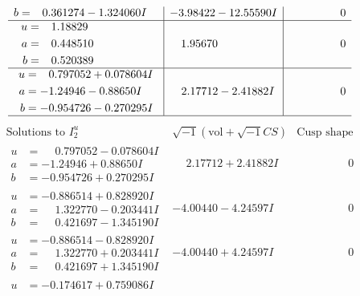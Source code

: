 \documentclass[1p]{elsarticle_modified}
\theoremstyle{definition}
\newcommand{\I}{\sqrt{-1}}
\begin{document}
$$\begin{array}{c|c|c}
\begin{aligned}
b &= \phantom{-}0.361274 - 1.324060 I\end{aligned}
 & -3.98422 - 12.55590 I & \phantom{-0.000000 } 0 \\ \hline\begin{aligned}
u &= \phantom{-}1.18829\phantom{ +0.000000I} \\
a &= \phantom{-}0.448510\phantom{ +0.000000I} \\
b &= \phantom{-}0.520389\phantom{ +0.000000I}\end{aligned}
 & \phantom{-}1.95670\phantom{ +0.000000I} & \phantom{-0.000000 } 0 \\ \hline\begin{aligned}
u &= \phantom{-}0.797052 + 0.078604 I \\
a &= -1.24946 - 0.88650 I \\
b &= -0.954726 - 0.270295 I\end{aligned}
 & \phantom{-}2.17712 - 2.41882 I & \phantom{-0.000000 } 0\\
 \hline 
 \end{array}$$\newpage$$\begin{array}{c|c|c}  
\text{Solutions to }I^u_{2}& \I (\text{vol} + \sqrt{-1}CS) & \text{Cusp shape}\\
 \hline 
\begin{aligned}
u &= \phantom{-}0.797052 - 0.078604 I \\
a &= -1.24946 + 0.88650 I \\
b &= -0.954726 + 0.270295 I\end{aligned}
 & \phantom{-}2.17712 + 2.41882 I & \phantom{-0.000000 } 0 \\ \hline\begin{aligned}
u &= -0.886514 + 0.828920 I \\
a &= \phantom{-}1.322770 - 0.203441 I \\
b &= \phantom{-}0.421697 - 1.345190 I\end{aligned}
 & -4.00440 - 4.24597 I & \phantom{-0.000000 } 0 \\ \hline\begin{aligned}
u &= -0.886514 - 0.828920 I \\
a &= \phantom{-}1.322770 + 0.203441 I \\
b &= \phantom{-}0.421697 + 1.345190 I\end{aligned}
 & -4.00440 + 4.24597 I & \phantom{-0.000000 } 0 \\ \hline\begin{aligned}
u &= -0.174617 + 0.759086 I \\

\end{aligned}
\end{array}$$
\end{document}
